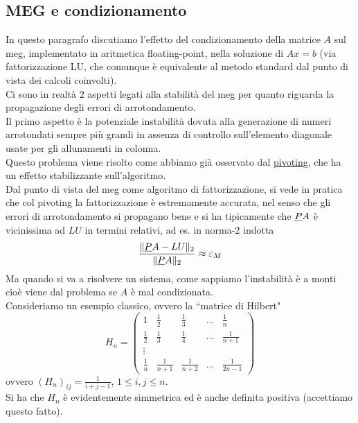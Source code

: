 \subsection{MEG e condizionamento}
In questo paragrafo discutiamo l'effetto del condizionamento della matrice $A$ sul meg, implementato in aritmetica floating-point, nella soluzione di $Ax=b$ (via fattorizzazione LU, che comunque è equivalente al metodo standard dal punto di vista dei calcoli coinvolti). \\
Ci sono in realtà 2 aspetti legati alla stabilità del meg per quanto riguarda la propagazione degli errori di arrotondamento.\\
Il primo aspetto è la potenziale instabilità dovuta alla generazione di numeri arrotondati sempre più grandi in assenza di controllo sull'elemento diagonale usate per gli allunamenti in colonna. \\
Questo problema viene risolto come abbiamo già osservato dal \uline{pivoting}, che ha un effetto stabilizzante sull'algoritmo. \\
Dal punto di vista del meg come algoritmo di fattorizzazione, si vede in pratica che col pivoting la fattorizzazione è estremamente accurata, nel senso che gli errori di arrotondamento si propagano bene e si ha tipicamente che $\uline{P}A$ è vicinissima ad $LU$ in termini relativi, ad es. in norma-2 indotta
\begin{equation*}
    \frac{\norma{\uline{P}A-LU}_2}{\norma{\uline{P}A}_2} \approx \varepsilon_M
\end{equation*}
Ma quando si va a risolvere un sistema, come sappiamo l'instabilità è a monti cioè viene dal problema se $A$ è mal condizionata.\\
Consideriamo un esempio classico, ovvero la ``matrice di Hilbert"
\begin{equation*}
    H_n=\begin{pmatrix}
        1 & \frac{1}{2} & \frac{1}{3} & \dots & \frac{1}{n} \\ 
        \frac{1}{2} & \frac{1}{3} & \frac{1}{4} & \dots & \frac{1}{n+1} \\ 
        \vdots &  &  &  &  \\ 
        \frac{1}{n} & \frac{1}{n+1} & \frac{1}{n+2} & \dots & \frac{1}{2n-1}
    \end{pmatrix}
\end{equation*}
ovvero $(H_n)_{ij} = \frac{1}{i+j-1}$, $1\leq i,j \leq n$. \\
Si ha che $H_n$ è evidentemente simmetrica ed è anche definita positiva (accettiamo questo fatto). \\
